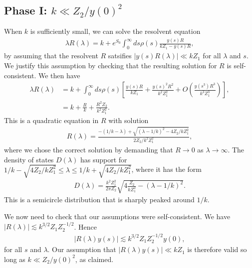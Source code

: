 \documentclass[11pt]{article}
\numberwithin{equation}{section}
\begin{document}
\subsection*{Phase I: $k \ll Z_2/y(0)^2$}
When $k$ is sufficiently small, we can solve the resolvent equation
\begin{align}
\lambda R(\lambda)  = k + e^{S_0}\int_0^\infty ds \rho(s) \frac{y(s) R}{k Z_1 - y(s) R},
\end{align}
by assuming that the resolvent $R$ satsifies $|y(s) R(\lambda)| \ll k Z_1$  for all $\lambda$ and  $s$. We justify this assumption by checking that the resulting solution for $R$ is self-consistent. We then have
\begin{align} \label{eq:taylor}
 \lambda R(\lambda) & = k + \int_0^\infty ds \rho(s) \left[\frac{y(s) R}{k Z_1} + \frac{y(s)^2 R^2}{k^2 Z_1^2} + O(\frac{y(s^3) R^3}{k^3 Z_1^3})\right],
\\& = k + \frac{R}{k} + \frac{R^2 Z_2}{k^2 Z_1^2}.
\end{align}
This is a quadratic equation in $R$ with solution
\begin{align} \label{eq:semicircle}
R(\lambda) = \frac{- (1/k - \lambda) + \sqrt{(\lambda - 1/k)^2 - 4 Z_2 / k Z_1^2 }}{2 Z_2 / k^2 Z_1^2},
\end{align}
where we chose the correct solution by demanding that $R \to 0$ as $\lambda \to \infty$. The density of states $D(\lambda)$ has support for $1/k - \sqrt{4 Z_2 / k Z_1^2} \leq \lambda \leq 1/k + \sqrt{4 Z_2 / k Z_1^2}$, where it has the form
\begin{align}
D(\lambda) = \frac{k^2 Z_1^2}{2 \pi  Z_2 } \sqrt{ 4 \frac{Z_2 }{ k Z_1^2} - ( \lambda - 1/k)^2 }.
\end{align}
This is a semicircle distribution that is sharply peaked around $1/k$.

We now need to check that our assumptions were self-consistent. We have $| R( \lambda) | \lesssim k^{3/2} Z_1 Z_2^{-1/2}$. Hence
\begin{align}
| R(\lambda) y(s) | \lesssim  k^{3/2} Z_1 Z_2^{-1/2} y(0),
\end{align}
for all $s$ and $\lambda$. Our assumption that $| R(\lambda) y(s) | \ll k Z_1$ is therefore valid so long as $k \ll Z_2 / y(0)^2$, as claimed.
\end{document}

